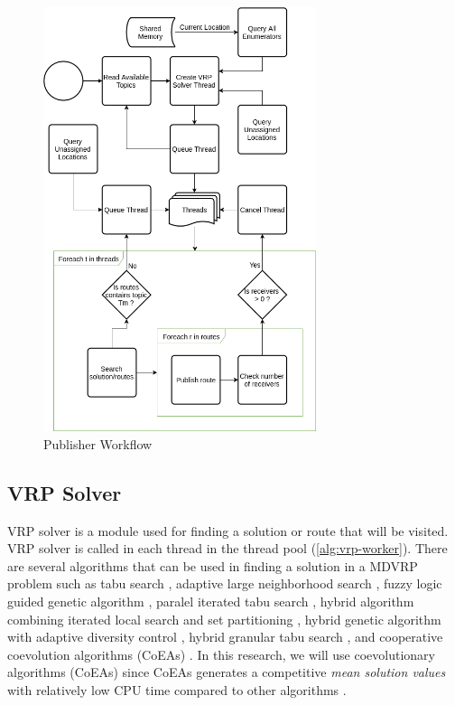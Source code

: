 \documentclass[conference]{IEEEtran}
\begin{document}
\begin{figure}[h]
	\centering
	\includegraphics[width=8cm]{Resources/Images/publisher-algorithm}
	\caption{Publisher Workflow}
	\label{fig:publisher-algorithm}
\end{figure} 


\subsection{VRP Solver}
\label{ssec:vrp-solver}
VRP solver is a module used for finding a solution or route that will be visited. VRP solver is called in each thread in the thread pool (\autoref{alg:vrp-worker}). There are several algorithms that can be used in finding a solution in a MDVRP problem such as tabu search \cite{cordeau_tabu_1997}, adaptive large neighborhood search  \cite{pisinger_general_2007}, fuzzy logic guided genetic algorithm \cite{lau_application_2010}, paralel iterated tabu search \cite{cordeau_parallel_2012}, hybrid algorithm combining iterated local search and set partitioning \cite{subramanian_hybrid_2013}, hybrid genetic algorithm with adaptive diversity control \cite{vidal_implicit_2014}, hybrid granular tabu search \cite{escobar_hybrid_2014}, and cooperative coevolution algorithms (CoEAs) \cite{de_oliveira_cooperative_2016}. In this research, we will use coevolutionary algorithms (CoEAs) since CoEAs generates a competitive \textit{mean solution values} with relatively low CPU time compared to other algorithms \cite{de_oliveira_cooperative_2016}. 
\end{document}
